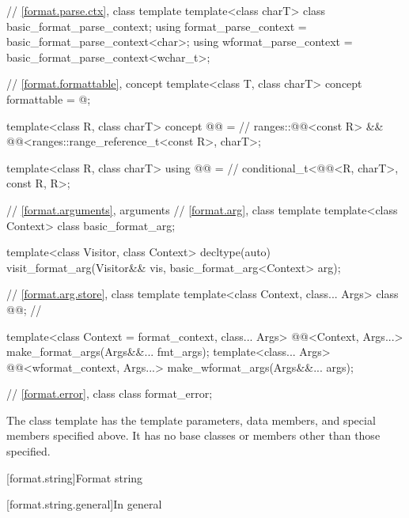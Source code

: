 \begin{codeblock}
{  // \ref{format.parse.ctx}, class template 
  template<class charT> class basic_format_parse_context;
  using format_parse_context = basic_format_parse_context<char>;
  using wformat_parse_context = basic_format_parse_context<wchar_t>;

  // \ref{format.formattable}, concept 
  template<class T, class charT>
    concept formattable = @\seebelow@;

  template<class R, class charT>
    concept @@ =                                   // \expos
      ranges::@@<const R> &&
      @@<ranges::range_reference_t<const R>, charT>;

  template<class R, class charT>
    using @@ =                                             // \expos
      conditional_t<@@<R, charT>, const R, R>;

  // \ref{format.arguments}, arguments
  // \ref{format.arg}, class template 
  template<class Context> class basic_format_arg;

  template<class Visitor, class Context>
    decltype(auto) visit_format_arg(Visitor&& vis, basic_format_arg<Context> arg);

  // \ref{format.arg.store}, class template 
  template<class Context, class... Args> class @@;        // \expos

  template<class Context = format_context, class... Args>
    @@<Context, Args...>
      make_format_args(Args&&... fmt_args);
  template<class... Args>
    @@<wformat_context, Args...>
      make_wformat_args(Args&&... args);

  // \ref{format.error}, class 
  class format_error;
}
\end{codeblock}


\pnum
The class template 
has the template parameters, data members, and special members specified above. It has no base classes or members other than those specified.

[format.string]{Format string}

[format.string.general]{In general}

\newcommand{\fmtnontermdef}[1]{{\BnfNontermshape#1\itcorr}\textnormal{:}}
\newcommand{\fmtgrammarterm}[1]{\gterm{#1}}

